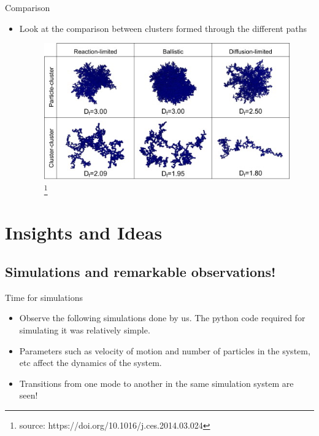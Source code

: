 \documentclass{beamer}
\begin{document}
\begin{frame}{Comparison}
    \begin{itemize}
        \item Look at the comparison between clusters formed through the different paths  
         \begin{figure}[h]
        \includegraphics[scale=.85]{all_agg.jpg}
        \footnote{source: https://doi.org/10.1016/j.ces.2014.03.024}
    \end{figure} 
    \end{itemize}
\end{frame}

\section{Insights and Ideas}

\subsection{Simulations and remarkable observations!}

\begin{frame}{Time for simulations}
\begin{itemize}
    

\item Observe the following simulations done by us. The python code required for simulating it was relatively simple.
\item Parameters such as velocity of motion and number of particles in the system, etc affect the dynamics of the system.
\item Transitions from one mode to another in the same simulation system are seen!
\end{itemize}
\end{frame}
\end{document}
